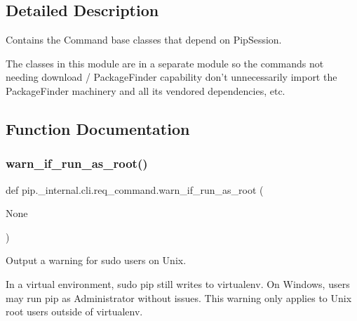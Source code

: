 \subsection{Detailed Description}
\begin{DoxyVerb}Contains the Command base classes that depend on PipSession.

The classes in this module are in a separate module so the commands not
needing download / PackageFinder capability don't unnecessarily import the
PackageFinder machinery and all its vendored dependencies, etc.
\end{DoxyVerb}
 

\subsection{Function Documentation}
\mbox{\label{namespacepip_1_1__internal_1_1cli_1_1req__command_a49ed2c503c37454eb2cd554c9a903df3}} 
\subsubsection{\texorpdfstring{warn\+\_\+if\+\_\+run\+\_\+as\+\_\+root()}{warn\_if\_run\_as\_root()}}
{\footnotesize\ttfamily def pip.\+\_\+internal.\+cli.\+req\+\_\+command.\+warn\+\_\+if\+\_\+run\+\_\+as\+\_\+root (\begin{DoxyParamCaption}\item[{}]{None }\end{DoxyParamCaption})}

\begin{DoxyVerb}Output a warning for sudo users on Unix.

In a virtual environment, sudo pip still writes to virtualenv.
On Windows, users may run pip as Administrator without issues.
This warning only applies to Unix root users outside of virtualenv.
\end{DoxyVerb}
 \mbox{\label{namespacepip_1_1__internal_1_1cli_1_1req__command_a01483dc3b1ec20f28893314cdbf697fb}} 
